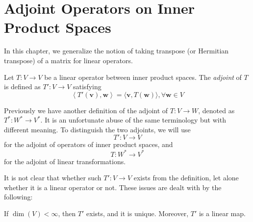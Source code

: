 \chapter{Adjoint Operators on Inner Product Spaces}

In this chapter, we generalize the notion of taking transpose (or Hermitian transpose) of a matrix for linear operators. 


\begin{definition} Let \(T : V \rightarrow  V\) be a linear operator between inner product spaces. The \emph{adjoint} of \(T\) is defined as \(T' : V \rightarrow  V\) satisfying
\[
\left\langle  {T'\left( \mathbf{v}\right),\mathbf{w}}\right\rangle   = \langle \mathbf{v},T\left( \mathbf{w}\right) \rangle,\forall \mathbf{w} \in  V \tag{10.1}
\]
\end{definition}

\begin{remark}
Previously we have another definition of the adjoint of \(T : V \rightarrow  W\), denoted as \({T}^{ * } : {W}^{ * } \rightarrow {V}^{ * }\). 
    It is an unfortunate abuse of the same terminology but with different meaning. To distinguish the two adjoints, we will use
    $$T':V \to V$$
    for the adjoint of operators of inner product spaces, and 
    $$T: W^* \to V^*$$
    for the adjoint of linear transformations.
\end{remark}

It is not clear that whether such $T':V \to V$ exists from the definition, let alone whether it is a linear operator or not. These issues are dealt with by the following:
\begin{proposition} If \(\dim \left( V\right)  < \infty\), then \(T'\) exists, and it is unique. Moreover, \(T'\) is a linear map.
\end{proposition}


